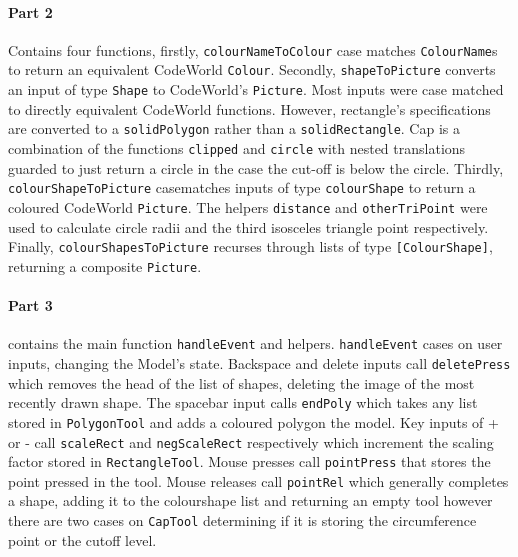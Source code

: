 \documentclass[11pt]{article}
\begin{document}
\paragraph{Part 2} Contains four functions, firstly, \verb|colourNameToColour|  case matches \verb|ColourName|s to return an equivalent CodeWorld  \verb|Colour|. Secondly, \verb|shapeToPicture| converts an input of type \verb|Shape| to CodeWorld's \verb|Picture|. Most inputs were case matched to directly equivalent CodeWorld functions. However, rectangle's specifications are converted to a \verb|solidPolygon| rather than a \verb|solidRectangle|.  Cap is a combination of the functions \verb|clipped| and \verb|circle| with nested translations guarded to just return a circle in the case the cut-off is below the circle. Thirdly, \verb|colourShapeToPicture| casematches inputs of type \verb|colourShape| to return a coloured CodeWorld  \verb|Picture|. The helpers \verb|distance| and \verb|otherTriPoint| were used to calculate circle radii and the third isosceles triangle point respectively. Finally, \verb|colourShapesToPicture| recurses through lists of type \verb|[ColourShape]|, returning a composite \verb|Picture|.

\paragraph{Part 3} contains the main function  \verb|handleEvent| and helpers. \verb|handleEvent| cases on user inputs, changing the Model's state. Backspace and delete inputs call \verb|deletePress| which removes the head of the list of shapes, deleting the image of the most recently drawn shape. The spacebar input calls  \verb|endPoly| which takes any list stored in  \verb|PolygonTool| and adds a coloured polygon the model. Key inputs of + or - call \verb|scaleRect| and \verb|negScaleRect| respectively which increment the scaling factor stored in \verb|RectangleTool|. Mouse presses call \verb|pointPress| that stores the point pressed in the tool. Mouse releases call \verb|pointRel| which generally completes a shape, adding it to the colourshape list and returning an empty tool however there are two cases on \verb|CapTool| determining if it is storing the circumference point or the cutoff level.
\end{document}
